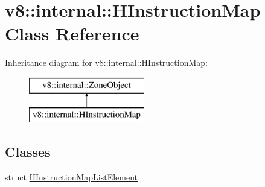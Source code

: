 \hypertarget{classv8_1_1internal_1_1_h_instruction_map}{}\section{v8\+:\+:internal\+:\+:H\+Instruction\+Map Class Reference}
\label{classv8_1_1internal_1_1_h_instruction_map}
Inheritance diagram for v8\+:\+:internal\+:\+:H\+Instruction\+Map\+:\begin{figure}[H]
\begin{center}
\leavevmode
\includegraphics[height=2.000000cm]{classv8_1_1internal_1_1_h_instruction_map}
\end{center}
\end{figure}
\subsection*{Classes}
\begin{DoxyCompactItemize}
\item 
struct \hyperlink{structv8_1_1internal_1_1_h_instruction_map_1_1_h_instruction_map_list_element}{H\+Instruction\+Map\+List\+Element}
\end{DoxyCompactItemize}
